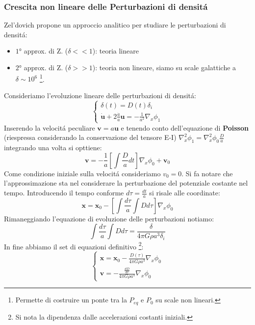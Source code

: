\documentclass[12pt, a4paper]{article}
\begin{document}
\subsubsection{Crescita non lineare delle Perturbazioni di densit\'{a}}
Zel'dovich propone un approccio analitico per studiare le perturbazioni di densit\'{a}:
\begin{itemize}
\item $1°$ approx. di Z. ($\delta <<1$): teoria lineare
\item $2°$ approx. di Z. ($\delta>>1$): teoria non lineare, siamo su scale galattiche  a $\delta\sim 10^6$ \footnote{Permette di costruire un ponte tra la $P_{eq}$ e $P_0$ su scale non lineari.}.
\end{itemize}
Consideriamo l'evoluzione lineare delle perturbazioni di densit\'{a}:
\begin{equation}
\begin{cases}
\delta(t)=D(t) \delta_i
\\
\dot{\mathbf{u}}+2\frac{\dot{a}}{a}\mathbf{u}=-\frac{1}{a^2}\nabla_x \phi_1
\end{cases}
\end{equation}
Inserendo la velocit\'{a} peculiare $\mathbf{v}=a\mathbf{u}$ e tenendo conto dell'equazione di \textbf{Poisson} (riespressa considerando la conservazione del tensore E-I) $\nabla_x^2\phi_1=\nabla_x^2\phi_0 \frac{D}{a}$  integrando una volta si opttiene:
\begin{equation}
\mathbf{v}=-\frac{1}{a} \left [ \int \frac{D}{a}dt\right ]\nabla_x \phi_0 + \mathbf{v}_0
\end{equation}
Come condizione iniziale sulla velocit\'{a} consideriamo $v_0=0$. Si fa notare che l'approssimazione sta nel considerare la perturbazione del potenziale costante nel tempo. Introducendo il tempo conforme $d\tau=\frac{dt}{a}$ si risale alle coordinate:
\begin{equation}
\mathbf{x}=\mathbf{x}_0-\left [ \int \frac{d\tau}{a}\int D d\tau\right ]\nabla_x \phi_0 
\end{equation}
Rimaneggiando l'equazione di evoluzione delle perturbazioni notiamo:
\begin{equation}
\int \frac{d\tau}{a}\int D d\tau=\frac{\delta}{4 \pi G \rho a^3 \delta_i}
\end{equation}
In fine abbiamo il set di equazioni definitivo \footnote{Si nota la dipendenza dalle accelerazioni costanti iniziali.}:
\begin{equation}
\begin{cases}
\mathbf{x}=\mathbf{x}_0- \frac{D(\tau)}{4 \pi G \rho a^3}\nabla_x \phi_0 
\\
\mathbf{v}=- \frac{\frac{dD}{d\tau}}{4 \pi G \rho a^3}\nabla_x \phi_0 
\end{cases}
\end{equation}
\end{document}
